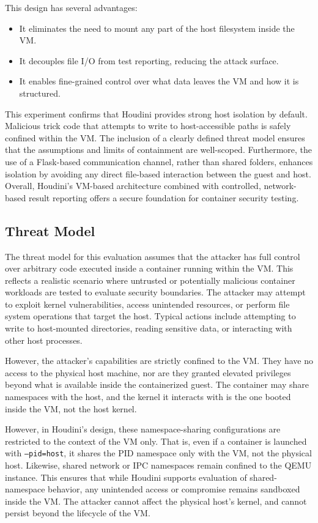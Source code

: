 \documentclass[12pt]{report}
\begin{document}
\begin{doublespace}
This design has several advantages:
\begin{itemize}
    \item It eliminates the need to mount any part of the host filesystem inside the VM.
    \item It decouples file I/O from test reporting, reducing the attack surface.
    \item It enables fine-grained control over what data leaves the VM and how it is structured.
\end{itemize}


This experiment confirms that Houdini provides strong host isolation by default. Malicious trick code that attempts to write to host-accessible paths is safely confined within the VM. The inclusion of a clearly defined threat model ensures that the assumptions and limits of containment are well-scoped. Furthermore, the use of a Flask-based communication channel, rather than shared folders, enhances isolation by avoiding any direct file-based interaction between the guest and host. Overall, Houdini’s VM-based architecture combined with controlled, network-based result reporting offers a secure foundation for container security testing.


\subsection{Threat Model}

The threat model for this evaluation assumes that the attacker has full control over arbitrary code executed inside a container running within the VM. This reflects a realistic scenario where untrusted or potentially malicious container workloads are tested to evaluate security boundaries. The attacker may attempt to exploit kernel vulnerabilities, access unintended resources, or perform file system operations that target the host. Typical actions include attempting to write to host-mounted directories, reading sensitive data, or interacting with other host processes.

However, the attacker’s capabilities are strictly confined to the VM. They have no access to the physical host machine, nor are they granted elevated privileges beyond what is available inside the containerized guest. The container may share namespaces with the host, and the kernel it interacts with is the one booted inside the VM, not the host kernel.

However, in Houdini’s design, these namespace-sharing configurations are restricted to the context of the VM only. That is, even if a container is launched with \texttt{--pid=host}, it shares the PID namespace only with the VM, not the physical host. Likewise, shared network or IPC namespaces remain confined to the QEMU instance. This ensures that while Houdini supports evaluation of shared-namespace behavior, any unintended access or compromise remains sandboxed inside the VM. The attacker cannot affect the physical host’s kernel, and cannot persist beyond the lifecycle of the VM.


\end{doublespace}
\end{document}
